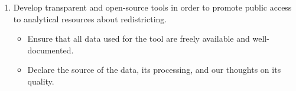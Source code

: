 \documentclass{mgggarticle}
\begin{document}
\begin{enumerate}
\begin{itemize}
\begin{itemize}
      \end{itemize}
  \end{itemize}
  \item Develop transparent and open-source tools in order to promote public access to analytical resources about redistricting. 
  \begin{itemize}
      \item Ensure that all data used for the tool are freely available and well-documented.
      \item Declare the source of the data, its processing, and our thoughts on its quality.
  \end{itemize}

\end{enumerate}
\end{document}

